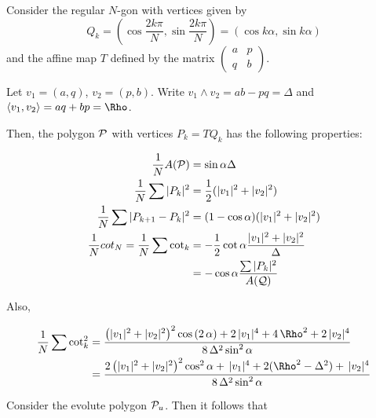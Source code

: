 


Consider the regular $N$-gon with vertices given by 
\[ Q_k=(\cos\frac{2k\pi}{N},\sin\frac{2k\pi}{N})= (\cos k\alpha,\sin k\alpha)\]
and the affine map $T$
defined by the matrix 
$\begin{pmatrix}a&p\\q&b\end{pmatrix}$.  %

Let $v_1=(a,q)$,  $v_2=(p,b)$.  Write 
 $v_1\wedge v_2=ab-pq=\Delta$ and $\langle v_1,v_2\rangle =aq+bp=\Rho$.



Then,  the  polygon $\mathcal{P}$ with vertices
$P_k=TQ_k$ has the following properties:



\begin{align*}
  \frac1{N} A(\mathcal{P}) &= \sin\alpha \Delta  \\
  \frac1{N} \sum |P_k|^2   &= \frac{1}{2}(|v_1|^2+ |v_2|^2 )\\
    \frac1{N} \sum |P_{k+1}-P_k|^2   &=(1-\cos\alpha)(|v_1|^2+|v_2|^2)\\
  \frac1{N}  cot_N  = \frac1{N}  \sum \cot_k &= -\frac{1}{2}\cot\alpha \frac{|v_1|^2+ |v_2|^2}{\Delta}\\
   &=-\cos\alpha \frac{\sum |P_k|^2}{A(\mathcal{Q})}
\end{align*}
   
 Also,
 
 \begin{align*}
  \frac{1}{N} \sum\cot_k^2& = \frac{ \left(   |v_1|^2+|v_2|^2 \right)^{2}
\cos \left( 2\,\alpha \right) +2\,  |v_1|^4
+4\, \Rho^{2}+2\, |v_2|^4
   }{8\, \Delta^{2}   \sin^2\alpha} \\
   &=\frac{ 2\left(   |v_1|^2+|v_2|^2 \right)^{2}
\cos^2  \alpha  + \,  |v_1|^4
+2(\Rho^2-\Delta^2) +\, |v_2|^4
   }{8\, \Delta^{2}   \sin^2\alpha
 }\end{align*}

Consider the evolute polygon $\mathcal{P}_u$. Then it follows that


